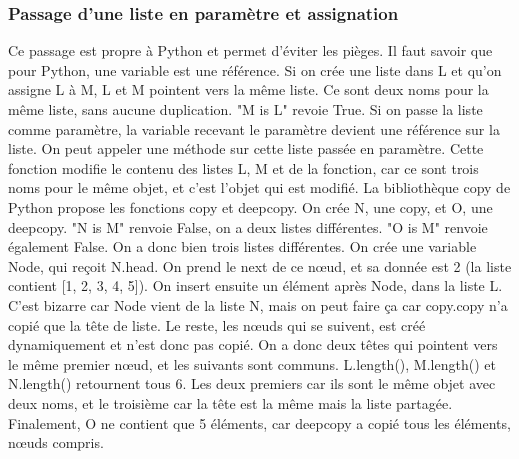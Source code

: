 \documentclass[10pt]{article}
\begin{document}
\subsubsection{Passage d'une liste en paramètre et assignation}
Ce passage est propre à Python et permet d'éviter les pièges. Il faut savoir que pour Python, une variable est une référence. Si on crée une liste dans L et qu'on assigne L à M, L et M pointent vers la même liste. Ce sont deux noms pour la même liste, sans aucune duplication. "M is L" revoie True. Si on passe la liste comme paramètre, la variable recevant le paramètre devient une référence sur la liste. On peut appeler une méthode sur cette liste passée en paramètre. Cette fonction modifie le contenu des listes L, M et de la fonction, car ce sont trois noms pour le même objet, et c'est l'objet qui est modifié. 
\newline \newline 
La bibliothèque copy de Python propose les fonctions copy et deepcopy. On crée N, une copy, et O, une deepcopy. "N is M" renvoie False, on a deux listes différentes. "O is M" renvoie également False. On a donc bien trois listes différentes. On crée une variable Node, qui reçoit N.head. On prend le next de ce nœud, et sa donnée est 2 (la liste contient [1, 2, 3, 4, 5]).
\newline \newline 
On insert ensuite un élément après Node, dans la liste L. C'est bizarre car Node vient de la liste N, mais on peut faire ça car copy.copy n'a copié que la tête de liste. Le reste, les nœuds qui se suivent, est créé dynamiquement et n'est donc pas copié. On a donc deux têtes qui pointent vers le même premier nœud, et les suivants sont communs. L.length(), M.length() et N.length() retournent tous 6. Les deux premiers car ils
sont le même objet avec deux noms, et le troisième car la tête est la même mais la liste partagée. 
\newline \newline 
Finalement, O ne contient que 5 éléments, car deepcopy a copié tous les éléments, nœuds compris.
\end{document}
